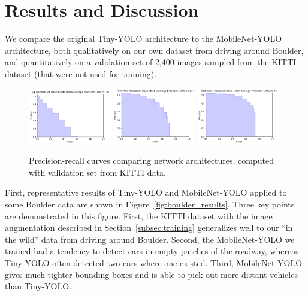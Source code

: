 \documentclass{article}
\begin{document}
\section{Results and Discussion}
\label{results}

We compare the original Tiny-YOLO architecture to the MobileNet-YOLO architecture, both qualitatively on our own dataset from driving around Boulder, and quantitatively on a validation set of 2,400 images sampled from the KITTI dataset (that were not used for training).

\begin{figure}[t]
  \centering
  \includegraphics[width=0.32\textwidth]{pr_curve_squeezenet_kitti_validation}
  \includegraphics[width=0.32\textwidth]{pr_curve_tinyyolo_kitti_validation}
  \includegraphics[width=0.32\textwidth]{pr_curve_mobilenet_kitti_validation}
  \caption{Precision-recall curves comparing network architectures, computed with validation set from KITTI data.}
  \label{fig:precition-recall}
\end{figure}

First, representative results of Tiny-YOLO and MobileNet-YOLO applied to some Boulder data are shown in Figure~\ref{fig:boulder_results}. Three key points are demonstrated in this figure. First, the KITTI dataset with the image augmentation described in Section~\ref{subsec:training} generalizes well to our ``in the wild'' data from driving around Boulder. Second, the MobileNet-YOLO we trained had a tendency to detect cars in empty patches of the roadway, whereas Tiny-YOLO often detected two cars where one existed. Third, MobileNet-YOLO gives much tighter bounding boxes and is able to pick out more distant vehicles than Tiny-YOLO.
\end{document}
